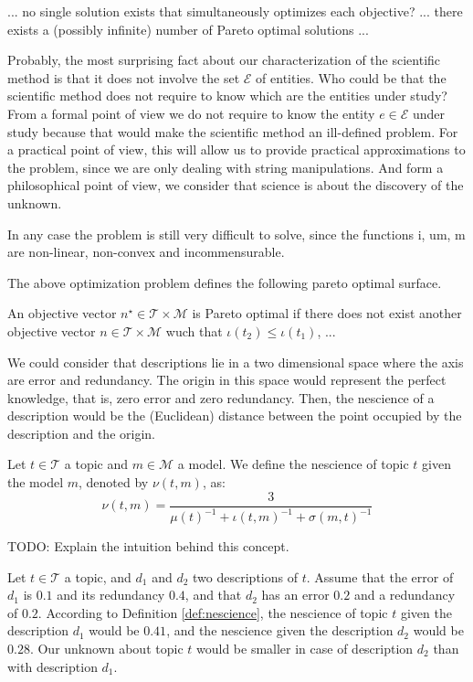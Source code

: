 ... no single solution exists that simultaneously optimizes each objective? ... there exists a (possibly infinite) number of Pareto optimal solutions ...

Probably, the most surprising fact about our characterization of the scientific method is that it does not involve the set $\mathcal{E}$ of entities. Who could be that the scientific method does not require to know which are the entities under study? From a formal point of view we do not require to know the entity $e \in \mathcal{E}$ under study because that would make the scientific method an ill-defined problem. For a practical point of view, this will allow us to provide practical approximations to the problem, since we are only dealing with string manipulations. And form a philosophical point of view, we consider that science is about the discovery of the unknown.

In any case the problem is still very difficult to solve, since the functions i, um, m are non-linear, non-convex and incommensurable.

The above optimization problem defines the following pareto optimal surface.

\begin{definition}
An objective vector $n^\star \in \mathcal{T} \times \mathcal{M}$ is Pareto optimal if there does not exist another objective vector $n \in \mathcal{T} \times \mathcal{M}$ wuch that $\iota(t_2) \leq \iota(t_1)$, ...
\end{definition}

We could consider that descriptions lie in a two dimensional space where the axis are error and redundancy. The origin in this space would represent the perfect knowledge, that is, zero error and zero redundancy. Then, the nescience of a description would be the (Euclidean) distance between the point occupied by the description and the origin.

\begin{definition} [Nescience]
\label{def:nescience}
Let $t \in \mathcal{T}$ a topic and $m \in \mathcal{M}$ a model. We define the nescience of topic $t$ given the model $m$, denoted by $\nu\left(t, m \right)$, as:
\[
\nu\left(t, m \right) = \frac{3}{ \mu(t)^{-1} + \iota(t, m)^{-1} + \sigma(m, t)^{-1}} 
\]
\end{definition}

{\color{red} TODO: Explain the intuition behind this concept.}

\begin{example}
\label{ex:nescience}
Let $t \in \mathcal{T}$ a topic, and $d_1$ and $d_2$ two descriptions of $t$. Assume that the error of $d_1$ is $0.1$ and its redundancy $0.4$, and that $d_2$ has an error $0.2$ and a redundancy of $0.2$. According to Definition \ref{def:nescience}, the nescience of topic $t$ given the description $d_1$ would be $0.41$, and the nescience given the description $d_2$ would be $0.28$. Our unknown about topic $t$ would be smaller in case of description $d_2$ than with description $d_1$.
\end{example}

